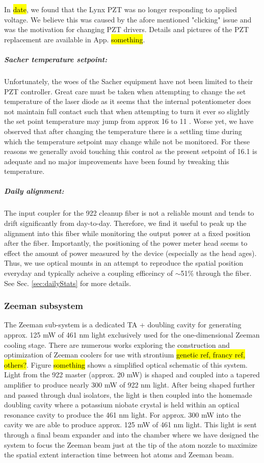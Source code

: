 In \hl{date}, we found that the Lynx PZT was no longer responding to applied voltage.
We believe this was caused by the afore mentioned "clicking" issue and was the motivation for changing PZT drivers.
Details and pictures of the PZT replacement are available in App. \hl{something}.

\subparagraph{Sacher temperature setpoint:}
Unfortunately, the woes of the Sacher equipment have not been limited to their PZT controller.
Great care must be taken when attempting to change the set temperature of the laser diode as it seems that the internal potentiometer does not maintain full contact such that when attempting to turn it ever so slightly the set point temperature may jump from approx 16 \degreeC to 11 \degreeC.
Worse yet, we have observed that after changing the temperature there is a settling time during which the temperature setpoint may change while not be monitored.
For these reasons we generally avoid touching this control as the present setpoint of 16.1 \degreeC is adequate and no major improvements have been found by tweaking this temperature.

\subparagraph{Daily alignment:}
The input coupler for the 922 cleanup fiber is not a reliable mount and tends to drift significantly from day-to-day.
Therefore, we find it useful to peak up the alignment into this fiber while monitoring the output power at a fixed position after the fiber.
Importantly, the positioning of the power meter head seems to effect the amount of power measured by the device (especially as the head ages).
Thus, we use optical mounts in an attempt to reproduce the spatial position everyday and typically acheive a coupling efficeincy of $\sim$51\% through the fiber.
See Sec. \ref{sec:dailyStats} for more details.
		
\subsubsection{Zeeman subsystem}
The Zeeman sub-system is a dedicated TA + doubling cavity for generating approx. 125 mW of 461 nm light exclusively used for the one-dimensional Zeeman cooling stage.
There are numerous works exploring the construction and optimization of Zeeman coolers for use with strontium \hl{genetic ref, francy ref, others?}.
Figure \hl{something} shows a simplified optical schematic of this system.
Light from the 922 master (approx. 20 mW) is shaped and coupled into a tapered amplifier to produce nearly 300 mW of 922 nm light.
After being shaped further and passed through dual isolators, the light is then coupled into the homemade doubling cavity where a potassium niobate crystal is held within an optical resonance cavity to produce the 461 nm light.
For approx. 300 mW into the cavity we are able to produce approx. 125 mW of 461 nm light.
This light is sent through a final beam expander and into the chamber where we have designed the system to focus the Zeeman beam just at the tip of the atom nozzle to maximize the spatial extent interaction time between hot atoms and Zeeman beam.

